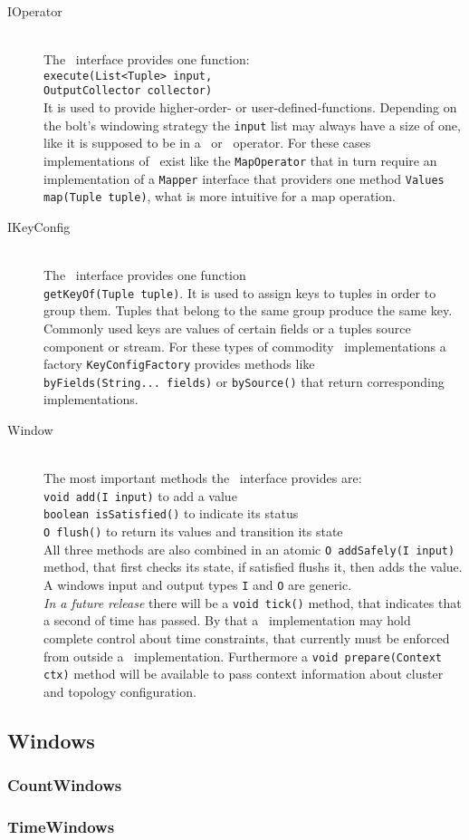 \begin{description}
	\item[IOperator] \hfill \\
	The \ioperator\ interface provides one function: \\
	\texttt{execute(List<Tuple> input, \\ OutputCollector collector)} \\
	It is used to provide higher-order- or user-defined-functions. Depending on the bolt's windowing strategy the \texttt{input} list may always have a size of one, like it is supposed to be in a \map\ or \filter\ operator. For these cases implementations of \ioperator\ exist like the \texttt{MapOperator} that in turn require an implementation of a \texttt{Mapper} interface that providers one method \texttt{Values map(Tuple tuple)}, what is more intuitive for a map operation.
	\item[IKeyConfig] \hfill \\
	\label{item:ikeyconfig}
	The \ikeyconfig\ interface provides one function \\ \texttt{getKeyOf(Tuple tuple)}. It is used to assign keys to tuples in order to group them. Tuples that belong to the same group produce the same key. Commonly used keys are values of certain fields or a tuples source component or stream. For these types of commodity  \ikeyconfig\ implementations a factory \texttt{KeyConfigFactory} provides methods like \\
	 \texttt{byFields(String... fields)} or \texttt{bySource()} that return corresponding implementations.
	\item[Window] \hfill \\
	The most important methods the \iwindow\ interface provides are:\\
	\texttt{void add(I input)} to add a value \\
	\texttt{boolean isSatisfied()} to indicate its status \\
	\texttt{O flush()} to return its values and transition its state  \\
	All three methods are also combined in an atomic 
	\texttt{O addSafely(I input)}
	method, that first checks its state, if satisfied flushs it, then adds the value.
	A windows input and output types \texttt{I} and \texttt{O} are generic. \\
	\textsl{In a future release} there will be a \texttt{void tick()} method, that indicates that a second of time has passed. By that a \iwindow\ implementation may hold complete control about time constraints, that currently must be enforced from outside a \iwindow\ implementation. Furthermore a \texttt{void prepare(Context ctx)} method will be available to pass context information about cluster and topology configuration. 
\end{description}

\subsection{Windows}
\label{sect:windows}

\subsubsection{CountWindows}

\subsubsection{TimeWindows}
\label{sect:Timewindow}